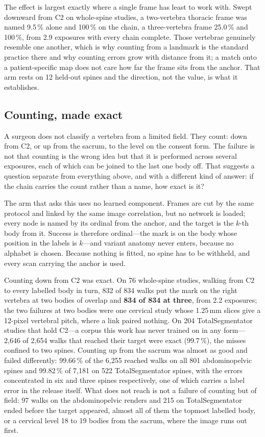 \documentclass[11pt,letterpaper]{article}
\begin{document}
The effect is largest exactly where a single frame has least to work with. Swept downward from C2 on
whole-spine studies, a two-vertebra thoracic frame was named 9.5\,\% alone and 100\,\% on the chain, a
three-vertebra frame 25.0\,\% and 100\,\%, from 2.9 exposures with every chain complete. Those
vertebrae genuinely resemble one another, which is why counting from a landmark is the standard practice
there and why counting errors grow with distance from it; a match onto a patient-specific map does not care
how far the frame sits from the anchor. That arm rests on 12 held-out spines and the direction, not the
value, is what it establishes.

\subsection*{Counting, made exact}
A surgeon does not classify a vertebra from a limited field. They count: down from C2, or up from the
sacrum, to the level on the consent form. The failure is not that counting is the wrong idea but that it
is performed across several exposures, each of which can be joined to the last one body off. That
suggests a question separate from everything above, and with a different kind of answer: if the chain
carries the count rather than a name, how exact is it?

The arm that asks this uses no learned component. Frames are cut by the same protocol and linked by the
same image correlation, but no network is loaded; every node is named by its ordinal from the anchor, and
the target is the $k$-th body from it. Success is therefore ordinal---the mark is on the body whose
position in the labels is $k$---and variant anatomy never enters, because no alphabet is chosen.
Because nothing is fitted, no spine has to be withheld, and every scan carrying the anchor is used.

Counting down from C2 was exact. On 76 whole-spine studies, walking from C2 to every labelled body in
turn, 832 of 834 walks put the mark on the right vertebra at two bodies of overlap and \textbf{834 of
834 at three}, from 2.2 exposures; the two failures at two bodies were one cervical study whose 1.25\,mm
slices give a 12-pixel vertebral pitch, where a link paired nothing. On 204 TotalSegmentator studies
that hold C2---a corpus this work has never trained on in any form---2,646 of 2,654 walks that reached
their target were exact (99.7\,\%), the misses confined to two spines. Counting up from the sacrum was
almost as good and failed differently: 99.66\,\% of the 6,255 reached walks on all 801 abdominopelvic
spines and 99.82\,\% of 7,181 on 522 TotalSegmentator spines, with the errors concentrated in six and
three spines respectively, one of which carries a label error in the release itself. What does not reach
is not a failure of counting but of field: 97 walks on the abdominopelvic renders and 215 on
TotalSegmentator ended before the target appeared, almost all of them the topmost labelled body, or a
cervical level 18 to 19 bodies from the sacrum, where the image runs out first.
\end{document}
